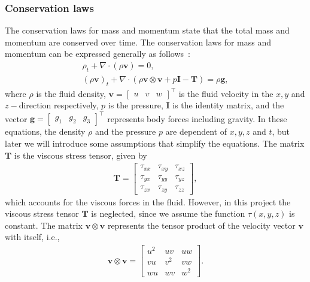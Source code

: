 \subsubsection*{Conservation laws}
The conservation laws for mass and momentum state that the total mass and momentum are conserved over time.
The conservation laws for mass and momentum can be expressed generally as follows~\cite[eq.'s (2.1) and (2.2)]{Toro2001-Shock}:
\begin{subequations}
    \begin{align}
        \rho_t + \nabla \cdot (\rho \mathbf{v}) = 0, \label{eq:mass_conservation} \\
        {(\rho \mathbf{v})}_t + \nabla \cdot (\rho \mathbf{v} \otimes \mathbf{v} + p \mathbf{I} - \mathbf{T}) = \rho \mathbf{g}, \label{eq:momentum_conservation}
    \end{align}
  \end{subequations}
where $\rho$ is the fluid density, $\mathbf{v} = \begin{bmatrix} u & v & w \end{bmatrix}^\top$ is the fluid velocity in the $x, y$ and $z-$direction respectively,
$p$ is the pressure, $\mathbf{I}$ is the identity matrix, and the vector $\mathbf{g} = \begin{bmatrix}
    g_1 & g_2 & g_3
\end{bmatrix}^\top$ represents body forces including gravity.
In these equations, the density $\rho$ and the pressure $p$ are dependent of $x, y, z$ and $t$, but later we will introduce some assumptions that simplify the equations.
The matrix $\mathbf{T}$ is the viscous stress tensor, given by
\begin{align*}
    \mathbf{T} = \begin{bmatrix}
        \tau_{xx} & \tau_{xy} & \tau_{xz} \\
        \tau_{yx} & \tau_{yy} & \tau_{yz} \\
        \tau_{zx} & \tau_{zy} & \tau_{zz}
    \end{bmatrix},
\end{align*}
which accounts for the viscous forces in the fluid.
However, in this project the viscous stress tensor $\mathbf{T}$ is neglected, since we assume the function $\tau(x,y,z)$ is constant.
The matrix $\mathbf{v} \otimes \mathbf{v}$ represents the tensor product of the velocity vector $\mathbf{v}$ with itself, i.e.,
\begin{align*}
    \mathbf{v} \otimes \mathbf{v} = \begin{bmatrix}
        u^2 & uv & uw \\
        vu & v^2 & vw \\
        wu & wv & w^2
    \end{bmatrix}.
\end{align*}
